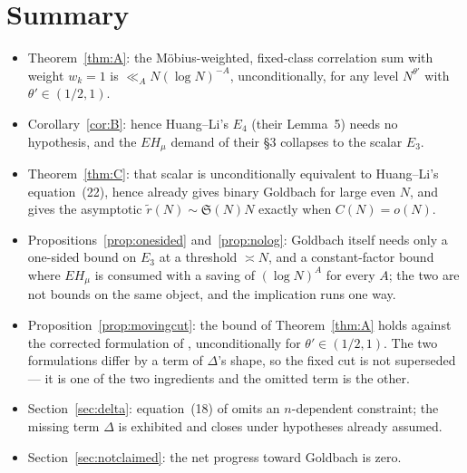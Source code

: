 \documentclass[11pt,a4paper]{article}
\theoremstyle{plain}
\theoremstyle{definition}
\theoremstyle{remark}
\renewcommand{\SS}{\mathfrak{S}}
\begin{document}
\section{Summary}

\begin{itemize}
\item Theorem~\ref{thm:A}: the M\"obius-weighted, fixed-class
correlation sum with weight $w_k=1$ is $\ll_A N(\log N)^{-A}$,
unconditionally, for any level $N^{\theta'}$ with
$\theta'\in(1/2,1)$.

\item Corollary~\ref{cor:B}: hence Huang--Li's $E_4$ (their Lemma~5)
needs no hypothesis, and the $EH_\mu$ demand of their \S3 collapses to
the scalar $E_3$.

\item Theorem~\ref{thm:C}: that scalar is unconditionally equivalent
to Huang--Li's equation~(22), hence already gives binary Goldbach for
large even $N$, and gives the asymptotic $\tilde r(N)\sim\SS(N)N$
exactly when $C(N)=o(N)$.

\item Propositions~\ref{prop:onesided} and~\ref{prop:nolog}: Goldbach
itself needs only a one-sided bound on $E_3$ at a threshold
$\asymp N$, and a constant-factor bound where $EH_\mu$ is consumed with
a saving of $(\log N)^A$ for every $A$; the two are not bounds on the
same object, and the implication runs one way.

\item Proposition~\ref{prop:movingcut}: the bound of
Theorem~\ref{thm:A} holds against the corrected formulation of
\cite{HL}, unconditionally for $\theta'\in(1/2,1)$. The two
formulations differ by a term of $\Delta$'s shape, so the fixed cut is
not
superseded --- it is one of the two ingredients and the omitted term is
the other.

\item Section~\ref{sec:delta}: equation~(18) of \cite{HL} omits an
$n$-dependent constraint; the missing term $\Delta$ is exhibited and
closes under hypotheses already assumed.

\item Section~\ref{sec:notclaimed}: the net progress toward Goldbach
is zero.
\end{itemize}
\end{document}
